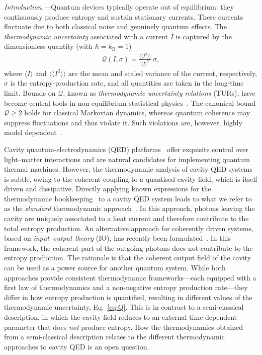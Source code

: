 \documentclass[aps,twocolumn,10pt,prl,floatfix,nofootinbib, superscriptaddress]{revtex4-2}
\begin{document}
\textit{Introduction.---}Quantum devices typically operate out of equilibrium: they continuously produce entropy and sustain stationary currents.
These currents fluctuate due to both classical noise and genuinely quantum effects. The \emph{thermodynamic uncertainty} associated with a current $I$ is captured by the dimensionless quantity (with $\hbar=k_\text{B}=1$)
\begin{align}
    \mathcal{Q}(I,\sigma)=\frac{\langle\!\langle I^2\rangle\!\rangle}{\langle I\rangle^2}\,\sigma,
    \label{eq:Q}
\end{align}
where $\langle I\rangle$ and $\langle\!\langle I^2\rangle\!\rangle$ are the mean and scaled variance of the current, respectively, $\sigma$ is the entropy-production rate, and all quantities are taken in the long-time limit. Bounds on $\mathcal{Q}$, known as \emph{thermodynamic uncertainty relations} (TURs), have become central tools in non-equilibrium statistical physics~\cite{Barato2015, Gingrich2016, Pietzonka2016, Pietzonka2017, Horowitz2020, Falasco2020}.
The canonical bound $\mathcal{Q}\ge 2$ holds for classical Markovian dynamics, whereas quantum coherence may suppress fluctuations and thus violate it. Such violations are, however, highly model dependent~\cite{Saryal2019, Janovitch2023, Agarwalla2018, Liu2019, Cangemi2020, Menczel2021, Ehrlich2021, Prech2023, Ptaszyski2023,  Almanza2025}.

Cavity quantum-electrodynamics (QED) platforms~\cite{Goban2014, Tiecke2014, DeSantis2017, Luan2020, Takahashi2020, Wang2019, Najer2019, Janovitch2024} offer exquisite control over light--matter interactions and are natural candidates for implementing quantum thermal machines.
However, the thermodynamic analysis of cavity QED systems is subtle, owing to the coherent coupling  to a quantised cavity field, which is itself driven and dissipative. Directly applying known expressions for the thermodynamic bookkeeping~\cite{Alicki_1979, spohn1978} to a cavity QED system leads to what we refer to as the \textit{standard} thermodynamic approach~\cite{Boukobza2006_bipartite, Vinjanampathy_2016,Potts_2021, potts2024quantumthermodynamics}. In this approach, photons leaving the cavity are uniquely associated to a heat current and therefore contribute to the total entropy production. An alternative approach for coherently driven systems, based on \textit{input--output theory} (IO), has recently been formulated~\cite{schrauwen2025,2024_prasad}. In this framework, the coherent part of the outgoing photons does not contribute to the entropy production. The rationale is that the coherent output field of the cavity can be used as a power source for another quantum system.
While both approaches provide consistent thermodynamic frameworks—each equipped with a first law of thermodynamics and a non-negative entropy production rate—they differ in how entropy production is quantified, resulting in different values of the thermodynamic uncertainty, Eq.~\eqref{eq:Q}. This is in contrast to a semi-classical description, in which the cavity field reduces to an external time-dependent parameter that does \textit{not} produce entropy. How the thermodynamics obtained from a semi-classical description relates to the different thermodynamic approaches to cavity QED is an open question.
\end{document}
